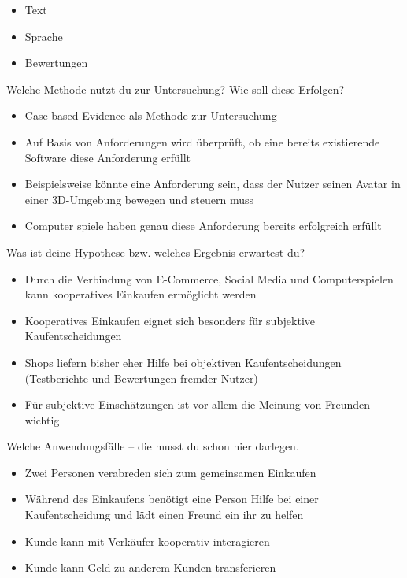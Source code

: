 \begin{itemize}
\item Text 
\item Sprache 
\item Bewertungen 
\end{itemize}

Welche Methode nutzt du zur Untersuchung? Wie soll diese Erfolgen?

\begin{itemize}
\item Case-based Evidence als Methode zur Untersuchung 
\item Auf Basis von Anforderungen wird überprüft, ob eine bereits existierende Software diese Anforderung erfüllt 
\item Beispielsweise könnte eine Anforderung sein, dass der Nutzer seinen Avatar in einer 3D-Umgebung bewegen und steuern muss 
\item Computer spiele haben genau diese Anforderung bereits erfolgreich erfüllt 
\end{itemize}

Was ist deine Hypothese bzw. welches Ergebnis erwartest du?

\begin{itemize}
\item Durch die Verbindung von E-Commerce, Social Media und Computerspielen kann kooperatives Einkaufen ermöglicht werden 
\item Kooperatives Einkaufen eignet sich besonders für subjektive Kaufentscheidungen 
\item Shops liefern bisher eher Hilfe bei objektiven Kaufentscheidungen (Testberichte und Bewertungen fremder Nutzer) 
\item Für subjektive Einschätzungen ist vor allem die Meinung von Freunden wichtig 
\end{itemize}

Welche Anwendungsfälle – die musst du schon hier darlegen.

\begin{itemize}
\item Zwei Personen verabreden sich zum gemeinsamen Einkaufen 
\item Während des Einkaufens benötigt eine Person Hilfe bei einer Kaufentscheidung und lädt einen Freund ein ihr zu helfen 
\item Kunde kann mit Verkäufer kooperativ interagieren 
\item Kunde kann Geld zu anderem Kunden transferieren
\end{itemize}
